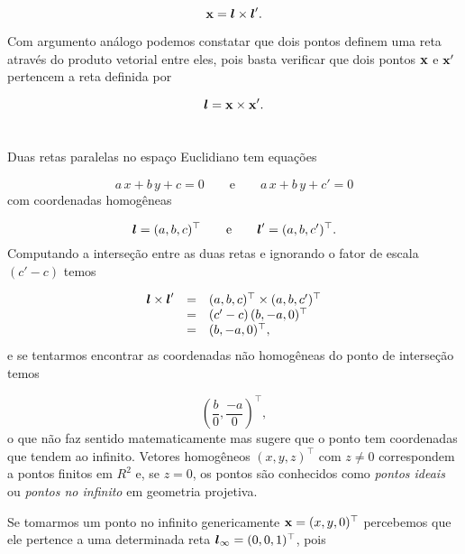 \begin{equation*}
\mathbf{x}=\boldsymbol{l}\times\boldsymbol{l}'.
\end{equation*}


Com argumento análogo podemos constatar que dois pontos definem uma reta através do produto vetorial entre eles, pois basta verificar que dois pontos $\mathbf{x}$ e $\mathbf{x}'$ pertencem a reta definida por

\begin{equation*}
\boldsymbol{l}=\mathbf{x}\times\mathbf{x}'.
\end{equation*}\\



Duas retas paralelas no espaço Euclidiano tem equações

\begin{equation*}
a\,x+b\,y+c=0\qquad\text{e}\qquad a\,x+b\,y+c'=0
\end{equation*}
com coordenadas homogêneas

\begin{equation*}
\boldsymbol{l}=(a,b,c)^\top\qquad\text{e}\qquad\boldsymbol{l}'=(a,b,c')^\top.
\end{equation*}
Computando a interseção entre as duas retas e ignorando o fator de escala $(c'-c)$ temos

\begin{equation*}
\begin{array}{rcl}
\boldsymbol{l}\times\boldsymbol{l}'&=&(a,b,c)^\top\times(a,b,c')^\top\\
&=&(c'-c)\,(b,-a,0)^\top\\
&=&(b,-a,0)^\top,
\end{array}
\end{equation*}
e se tentarmos encontrar as coordenadas não homogêneas do ponto de interseção temos

\begin{equation*}
\left(\frac{b}{0},\frac{-a}{0}\right)^\top,
\end{equation*}
o que não faz sentido matematicamente mas sugere que o ponto tem coordenadas que tendem ao infinito. Vetores homogêneos $(x,y,z)^\top$ com $z\neq0$ correspondem a pontos finitos em $R^2$ e, se $z=0$, os pontos são conhecidos como \textit{pontos ideais} ou \textit{pontos no infinito} em geometria projetiva.

Se tomarmos um ponto no infinito genericamente $\mathbf{x}=(x,y,0)^\top$ percebemos que ele pertence a uma determinada reta $\boldsymbol{l}_\infty=(0,0,1)^\top$, pois

